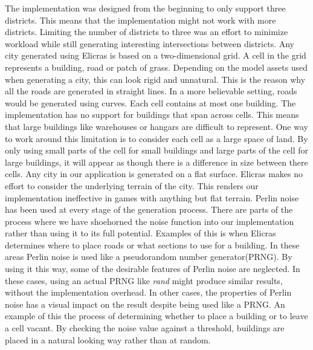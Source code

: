 	The implementation was designed from the beginning to only support three districts. This means that the implementation might not work with more districts. Limiting the number of districts to three was an effort to minimize workload while still generating interesting intersections between districts.
	Any city generated using Elicras is based on a two-dimensional grid. A cell in the grid represents a building, road or patch of grass. Depending on the model assets used when generating a city, this can look rigid and unnatural. This is the reason why all the roads are generated in straight lines. In a more believable setting, roads would be generated using curves. %
	Each cell contains at most one building. The implementation has no support for buildings that span across cells. This means that large buildings like warehouses or hangars are difficult to represent. One way to work around this limitation is to consider each cell as a large space of land. By only using small parts of the cell for small buildings and large parts of the cell for large buildings, it will appear as though there is a difference in size between there cells.
	Any city in our application is generated on a flat surface. Elicras makes no effort to consider the underlying terrain of the city. This renders our implementation ineffective in games with anything but flat terrain.
	Perlin noise has been used at every stage of the generation process. There are parts of the process where we have shoehorned the noise function into our implementation rather than using it to its full potential. Examples of this is when Elicras determines where to place roads or what sections to use for a building. In these areas Perlin noise is used like a pseudorandom number generator(PRNG). By using it this way, some of the desirable features of Perlin noise are neglected. In these cases, using an actual PRNG like \textit{rand}\cite{RandCRT} might produce similar results, without the implementation overhead. In other cases, the properties of Perlin noise has a visual impact on the result despite being used like a PRNG. An example of this the process of determining whether to place a building or to leave a cell vacant. By checking the noise value against a threshold, buildings are placed in a natural looking way rather than at random.
	

